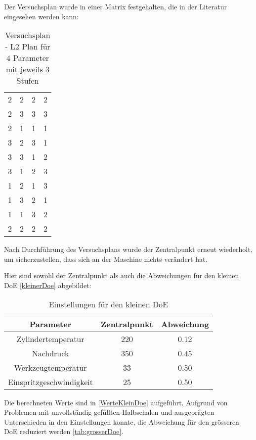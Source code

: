 Der Versuchsplan wurde in einer Matrix festgehalten, die in der Literatur \cite{VorlesungWah} eingesehen werden kann:

\begin{table}[h]
\centering
\begin{tabular}{cccc}
2 & 2 & 2 & 2 \\
2 & 3 & 3 & 3 \\
2 & 1 & 1 & 1 \\
3 & 2 & 3 & 1 \\
3 & 3 & 1 & 2 \\
3 & 1 & 2 & 3 \\
1 & 2 & 1 & 3 \\
1 & 3 & 2 & 1 \\
1 & 1 & 3 & 2 \\
2 & 2 & 2 & 2 \\
\end{tabular}
\caption{Versuchsplan - L2 Plan für 4 Parameter mit jeweils 3 Stufen}
\label{tab:doe_matrix}
\end{table}

Nach Durchführung des Versuchsplans wurde der Zentralpunkt erneut wiederholt, um sicherzustellen, dass sich an der Maschine nichts verändert hat.

Hier sind sowohl der Zentralpunkt als auch die Abweichungen für den kleinen DoE \ref{kleinerDoe} abgebildet:

\begin{table}[h]
\centering
\begin{tabular}{ccc}
\hline
\textbf{Parameter} & \textbf{Zentralpunkt} & \textbf{Abweichung} \\
\hline
Zylindertemperatur & 220 & 0.12 \\
Nachdruck & 350 & 0.45 \\
Werkzeugtemperatur & 33 & 0.50 \\
Einspritzgeschwindigkeit & 25 & 0.50\\
\hline
\end{tabular}
\caption{Einstellungen für den kleinen DoE}
\label{tab:ein_klein_doe}
\end{table}

Die berechneten Werte sind in \ref{WerteKleinDoe} aufgeführt. Aufgrund von Problemen mit unvollständig gefüllten Halbschalen und ausgeprägten Unterschieden in den Einstellungen konnte, die Abweichung für den grösseren DoE reduziert werden \ref{tab:grosserDoe}.
